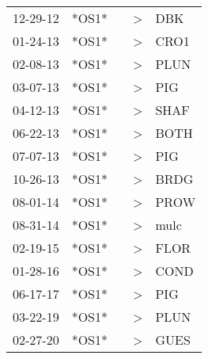 \begin{supertabular}{lllll}
 12-29-12 &  *OS1* &   &  \textgreater &   DBK \\
 01-24-13 &  *OS1* &   &  \textgreater &  CRO1 \\
 02-08-13 &  *OS1* &   &  \textgreater &  PLUN \\
 03-07-13 &  *OS1* &   &  \textgreater &   PIG \\
 04-12-13 &  *OS1* &   &  \textgreater &  SHAF \\
 06-22-13 &  *OS1* &   &  \textgreater &  BOTH \\
 07-07-13 &  *OS1* &   &  \textgreater &   PIG \\
 10-26-13 &  *OS1* &   &  \textgreater &  BRDG \\
 08-01-14 &  *OS1* &   &  \textgreater &  PROW \\
 08-31-14 &  *OS1* &   &  \textgreater &  mulc \\
 02-19-15 &  *OS1* &   &  \textgreater &  FLOR \\
 01-28-16 &  *OS1* &   &  \textgreater &  COND \\
 06-17-17 &  *OS1* &   &  \textgreater &   PIG \\
 03-22-19 &  *OS1* &   &  \textgreater &  PLUN \\
 02-27-20 &  *OS1* &   &  \textgreater &  GUES \\
\end{supertabular}
